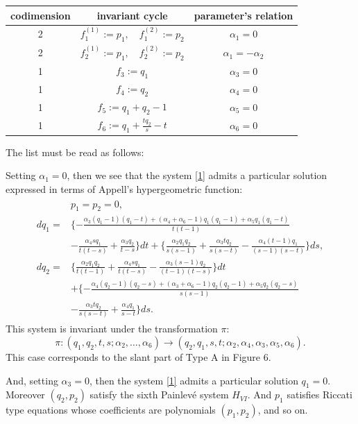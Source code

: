 \begin{center}
\begin{tabular}{|c|c|c|} \hline
codimension & invariant cycle & parameter's relation \\ \hline
2 & $f_1^{(1)}:=p_1, \quad f_1^{(2)}:=p_2$ & $\alpha_1=0$  \\ \hline
2 & $f_2^{(1)}:=p_1, \quad f_2^{(2)}:=p_2$ & $\alpha_1=-\alpha_2$  \\ \hline
1 & $f_3:=q_1$ & $\alpha_3=0$  \\ \hline
1 & $f_4:=q_2$ & $\alpha_4=0$  \\ \hline
1 & $f_5:=q_1+q_2-1$ & $\alpha_5=0$   \\ \hline
1 & $f_6:=q_1+\frac{tq_2}{s}-t$ & $\alpha_6=0$   \\ \hline
\end{tabular}
\end{center}
The list must be read as follows:

\noindent
Setting $\alpha_1=0$, then we see that the system \eqref{1} admits a particular solution expressed in terms of Appell's hypergeometric function:
\begin{align}
\begin{split}
&p_1=p_2=0,\\
dq_1=&\{-\frac{\alpha_3(q_1-1)(q_1-t)+(\alpha_4+\alpha_6-1)q_1(q_1-1)+\alpha_5q_1(q_1-t)}{t(t-1)}\\
&-\frac{\alpha_4 sq_1}{t(t-s)}+\frac{\alpha_3 q_2}{t-s}\}dt+\{\frac{\alpha_2 q_1q_2}{s(s-1)}+\frac{\alpha_3 tq_2}{s(s-t)}-\frac{\alpha_4(t-1)q_1}{(s-1)(s-t)}\}ds,\\
dq_2=&\{\frac{\alpha_2 q_1q_2}{t(t-1)}+\frac{\alpha_4 sq_1}{t(t-s)}-\frac{\alpha_3(s-1)q_2}{(t-1)(t-s)}\}dt\\
&+\{-\frac{\alpha_4(q_2-1)(q_2-s)+(\alpha_3+\alpha_6-1)q_2(q_2-1)+\alpha_5q_2(q_2-s)}{s(s-1)}\\
&-\frac{\alpha_3 tq_2}{s(s-t)}+\frac{\alpha_4 q_1}{s-t}\}ds.
\end{split}
\end{align}
This system is invariant under the transformation $\pi$:
$$
\pi:(q_1,q_2,t,s;\alpha_2,\dots,\alpha_6) \rightarrow (q_2,q_1,s,t;\alpha_2,\alpha_4,\alpha_3,\alpha_5,\alpha_6).
$$
This case corresponds to the slant part of Type A in Figure 6.

\noindent
And, setting $\alpha_3=0$, then the system \eqref{1} admits a particular solution $q_1=0$. Moreover $(q_2,p_2)$ satisfy the sixth Painlev\'e system $H_{VI}$. And $p_1$ satisfies Riccati type equations whose coefficients are polynomials $(p_1,p_2)$, and so on.






